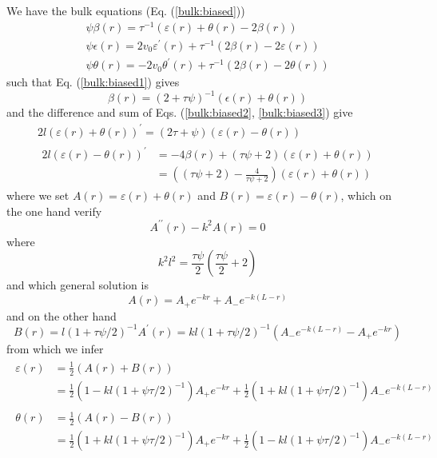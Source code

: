 \documentclass[pre,aps,superscriptaddress,nofootinbib]{revtex4}
\begin{document}
We have the bulk equations (Eq. (\ref{bulk:biased}))
\begin{eqnarray}
\label{bulk:biased1}
\psi \beta(r) = \tau^{-1} (\varepsilon(r) + \theta(r) - 2 \beta(r))\\
\label{bulk:biased2}
\psi \epsilon(r) = 2 v_0 \varepsilon^{\prime}(r) + \tau^{-1} (2 \beta(r) - 2 \varepsilon(r))\\
\label{bulk:biased3}
\psi \theta(r) = -2 v_0 \theta^{\prime}(r) + \tau^{-1} (2 \beta(r) - 2 \theta(r))
\end{eqnarray}
such that Eq. (\ref{bulk:biased1}) gives
\begin{equation}
\beta(r) = (2 + \tau\psi)^{-1} (\epsilon(r) + \theta(r))
\end{equation}
and the difference and sum of Eqs. (\ref{bulk:biased2}, \ref{bulk:biased3}) give
\begin{eqnarray}
2 l (\varepsilon(r) + \theta(r))^{\prime} = (2 \tau + \psi)(\varepsilon(r) - \theta(r))\\
\begin{aligned}
2 l (\varepsilon(r) - \theta(r))^{\prime} &= -4 \beta(r) + (\tau\psi + 2)(\varepsilon(r) + \theta(r))\\
&= \left((\tau\psi + 2) - \frac{4}{\tau\psi + 2}\right)(\varepsilon(r) + \theta(r))
\end{aligned}
\end{eqnarray}
where we set $A(r) = \varepsilon(r) + \theta(r)$ and $B(r) = \varepsilon(r) - \theta(r)$, which on the one hand verify
\begin{equation}
A^{\prime\prime}(r) - k^2 A(r) = 0
\end{equation}
where
\begin{equation}
k^2 l^2 = \frac{\tau \psi}{2}\left(\frac{\tau \psi}{2} + 2\right)
\label{kPsi}
\end{equation}
and which general solution is
\begin{equation}
A(r) = A_+ e^{- k r} + A_- e^{-k (L - r)}
\end{equation}
and on the other hand
\begin{equation}
B(r) = l(1 + \tau \psi/2)^{-1} A^{\prime}(r) = kl (1 + \tau\psi/2)^{-1} (A_- e^{-k(L - r)} - A_+ e^{-k r})
\end{equation}
from which we infer
\begin{eqnarray}
\label{epsilon}
\begin{aligned}
\varepsilon(r) &= \frac{1}{2} (A(r) + B(r))\\
&= \frac{1}{2}\left(1 - k l (1 + \psi \tau/2)^{-1}\right) A_+ e^{- k r} + \frac{1}{2}\left(1 + k l (1 + \psi \tau/2)^{-1}\right) A_- e^{- k (L - r)}
\end{aligned}
\mbox{}\\
\label{theta}
\begin{aligned}
\theta(r) &= \frac{1}{2} (A(r) - B(r))\\
&= \frac{1}{2}\left(1 + k l (1 + \psi \tau/2)^{-1}\right) A_+ e^{- k r} + \frac{1}{2}\left(1 - k l (1 + \psi \tau/2)^{-1}\right) A_- e^{- k (L - r)}
\end{aligned}
\end{eqnarray}
\end{document}
